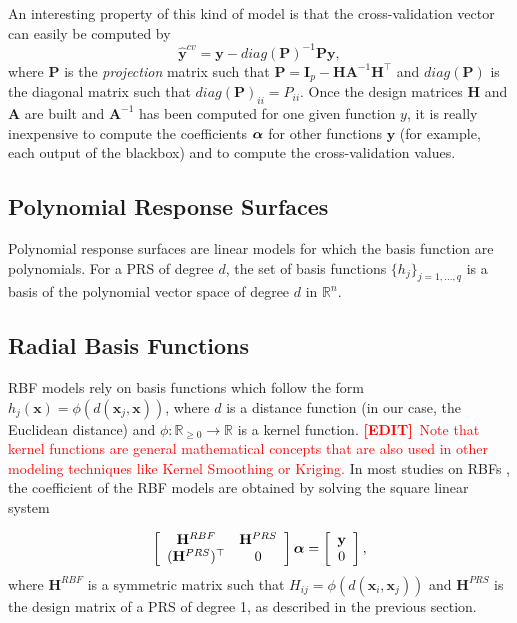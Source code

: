 \documentclass[12pt]{article}
\def\R{{\mathbb{R}}}
\newcommand{\y}{\mathbf{y}}
\newcommand{\I}{\mathbf{I}}
\newcommand{\A}{\mathbf{A}}
\newcommand{\x}{\mathbf{x}}
\renewcommand{\H}{\mathbf{H}}
\newcommand{\ycv}{\hat{\y}^{cv}}
\newcommand{\mynote}[1]{
  \textbf{\underline{Note}:~#1}
}
\renewcommand{\mynote}[1]{\textcolor{red}{\textbf{[EDIT]}~#1}}
\renewcommand{\t}{^\top}
\begin{document}
An interesting property of this kind of model is that the cross-validation vector can easily be computed by
\begin{equation}
  \ycv  = \y- diag({\mathbf P})^{-1} {\mathbf P} \y,
\end{equation}
where ${\mathbf P}$ is the \emph{projection} matrix \cite{orr1996introduction} such that ${\mathbf P} = \I_p - \H \A^{-1} \H\t$ and $diag({\mathbf P})$ is the diagonal matrix such that $diag({\mathbf P})_{ii} = P_{ii}$.
Once the design matrices $\H$ and $\A$ are built and $\A^{-1}$ has been computed for one given function $y$, it is really inexpensive to compute the coefficients $\boldsymbol{\alpha}$ for other functions $\y$
 (for example, each output of the blackbox) and to compute the cross-validation values.

\subsection{Polynomial Response Surfaces}
\label{sec:PRS}
Polynomial response surfaces are linear models for which the basis function are polynomials. For a PRS of degree $d$, the set of basis functions $\{h_j\}_{j=1,...,q}$ is a basis of the polynomial vector space of degree $d$ in $\R^n$. 

\subsection{Radial Basis Functions}
\label{sec:RBF}

RBF models rely on basis functions which follow the form $h_j(\x) = \phi(d(\x_j,\x))$, where $d$ is a distance function (in our case, the Euclidean distance) and $\phi:\R_{\ge 0}\rightarrow \R $ is a kernel function. \mynote{Note that kernel functions are general mathematical concepts that are also used in other modeling techniques like Kernel Smoothing or Kriging.} In most studies on RBFs
\cite{buhmann2003radial,orr1996introduction,
GoelErrorCriteria2009,AcarOptimizedWeight2009,VianaEgoMusu2013}, the coefficient of the RBF models are obtained by solving the square linear system

\begin{equation}
  \left[ \begin{array}{c c}
    \H^{RBF} & \H^{PRS} \\
    (\H^{PRS})\t & 0 \\
    \end{array}
  \right] \a = \left[ \begin{array}{c}
    \y \\
    0 \\
    \end{array}
  \right],
  \label{eq:rbf-std}
\end{equation}
where $\H^{RBF}$ is a symmetric matrix such that $H_{ij} = \phi(d(\x_i,\x_j))$ and $\H^{PRS}$ is the design matrix of a PRS of degree 1, as described in the previous section. 
\end{document}
